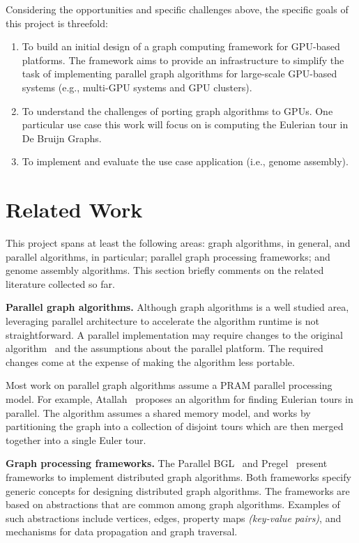 \documentclass{acm_proc_article-sp}[12pt]
\begin{document}
Considering the opportunities and specific challenges above, the
specific goals of this project is threefold: 

\begin{enumerate}
  \item To build an initial design of a graph computing framework 
    for GPU-based platforms. The framework aims to provide an infrastructure
    to simplify the task of implementing parallel graph algorithms for
    large-scale GPU-based systems (e.g., multi-GPU systems and GPU
    clusters).

  \item To understand the challenges of porting graph algorithms to
    GPUs. One particular use case this work will focus on is computing 
    the Eulerian tour in De Bruijn Graphs.

  \item To implement and evaluate the use case application (i.e.,
    genome assembly).
\end{enumerate}

\section{Related Work}
\label{sec:related}
This project spans at least the following areas: graph algorithms, in
general, and parallel algorithms, in particular; parallel graph
processing frameworks; and genome assembly algorithms. This section
briefly comments on the related literature collected so far.

{\bf Parallel graph algorithms.} Although graph algorithms is a well
studied area, leveraging parallel architecture to accelerate the
algorithm runtime is not straightforward. A parallel implementation
may require changes to the original
algorithm~\cite{Quinn1984,Atallah1984} and the assumptions about the
parallel platform. The required changes come at the expense of making
the algorithm less portable.

Most work on parallel graph algorithms assume a PRAM parallel
processing model. For example, Atallah~\cite{Atallah1984} proposes an
algorithm for finding Eulerian tours in parallel. The algorithm
assumes a shared memory model, and works by partitioning the graph
into a collection of disjoint tours which are then merged together
into a single Euler tour.

{\bf Graph processing frameworks.} The Parallel
BGL~\cite{gregor2005parallel} and Pregel~\cite{Malewicz2009} present
frameworks to implement distributed graph algorithms. Both frameworks
specify generic concepts for designing distributed graph
algorithms. The frameworks are based on abstractions that are common
among graph algorithms. Examples of such abstractions include
vertices, edges, property maps {\em (key-value pairs)}, and mechanisms
for data propagation and graph traversal. 
\end{document}
